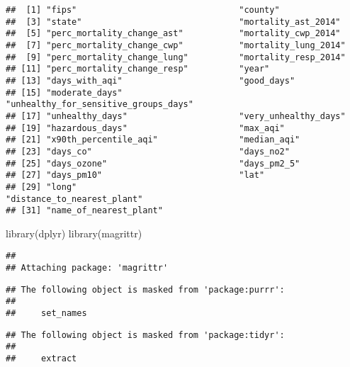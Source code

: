 \documentclass[
]{article}
\newenvironment{Shaded}{\begin{snugshade}}{\end{snugshade}}
\newcommand{\FunctionTok}[1]{\textcolor[rgb]{0.00,0.00,0.00}{#1}}
\newcommand{\NormalTok}[1]{#1}
\begin{document}
\begin{verbatim}
##  [1] "fips"                                "county"                             
##  [3] "state"                               "mortality_ast_2014"                 
##  [5] "perc_mortality_change_ast"           "mortality_cwp_2014"                 
##  [7] "perc_mortality_change_cwp"           "mortality_lung_2014"                
##  [9] "perc_mortality_change_lung"          "mortality_resp_2014"                
## [11] "perc_mortality_change_resp"          "year"                               
## [13] "days_with_aqi"                       "good_days"                          
## [15] "moderate_days"                       "unhealthy_for_sensitive_groups_days"
## [17] "unhealthy_days"                      "very_unhealthy_days"                
## [19] "hazardous_days"                      "max_aqi"                            
## [21] "x90th_percentile_aqi"                "median_aqi"                         
## [23] "days_co"                             "days_no2"                           
## [25] "days_ozone"                          "days_pm2_5"                         
## [27] "days_pm10"                           "lat"                                
## [29] "long"                                "distance_to_nearest_plant"          
## [31] "name_of_nearest_plant"
\end{verbatim}

\begin{Shaded}
\begin{Highlighting}[]
\FunctionTok{library}\NormalTok{(dplyr)}
\FunctionTok{library}\NormalTok{(magrittr)}
\end{Highlighting}
\end{Shaded}

\begin{verbatim}
## 
## Attaching package: 'magrittr'
\end{verbatim}

\begin{verbatim}
## The following object is masked from 'package:purrr':
## 
##     set_names
\end{verbatim}

\begin{verbatim}
## The following object is masked from 'package:tidyr':
## 
##     extract
\end{verbatim}
\end{document}
